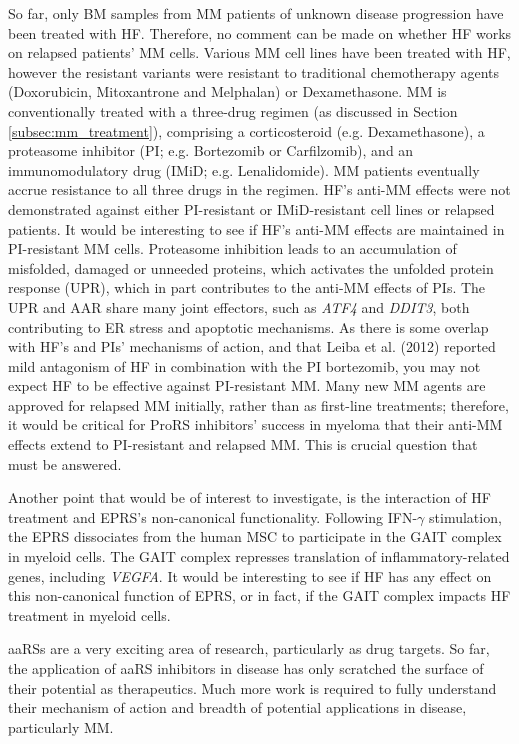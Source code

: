 So far, only BM samples from MM patients of unknown disease progression have been treated with HF\@.
Therefore, no comment can be made on whether HF works on relapsed patients' MM cells.
Various MM cell lines have been treated with HF, however the resistant variants were resistant to traditional chemotherapy agents (Doxorubicin, Mitoxantrone and Melphalan) or Dexamethasone.
MM is conventionally treated with a three-drug regimen (as discussed in Section \ref{subsec:mm_treatment}), comprising a corticosteroid (e.g. Dexamethasone), a proteasome inhibitor (PI; e.g. Bortezomib or Carfilzomib), and an immunomodulatory drug (IMiD; e.g. Lenalidomide).
MM patients eventually accrue resistance to all three drugs in the regimen.
HF's anti-MM effects were not demonstrated against either PI-resistant or IMiD-resistant cell lines or relapsed patients.
It would be interesting to see if HF's anti-MM effects are maintained in PI-resistant MM cells.
Proteasome inhibition leads to an accumulation of misfolded, damaged or unneeded proteins, which activates the unfolded protein response (UPR), which in part contributes to the anti-MM effects of PIs.
The UPR and AAR share many joint effectors, such as \textit{ATF4} and \textit{DDIT3}, both contributing to ER stress and apoptotic mechanisms.
As there is some overlap with HF's and PIs' mechanisms of action, and that Leiba et al. (2012) reported mild antagonism of HF in combination with the PI bortezomib\cite{leiba2012halofuginone}, you may not expect HF to be effective against PI-resistant MM.
Many new MM agents are approved for relapsed MM initially, rather than as first-line treatments;
therefore, it would be critical for ProRS inhibitors' success in myeloma that their anti-MM effects extend to PI-resistant and relapsed MM.
This is crucial question that must be answered.

Another point that would be of interest to investigate, is the interaction of HF treatment and EPRS's non-canonical functionality.
Following IFN-$\gamma$ stimulation, the EPRS dissociates from the human MSC to participate in the GAIT complex in myeloid cells.
The GAIT complex represses translation of inflammatory-related genes, including \textit{VEGFA}.
It would be interesting to see if HF has any effect on this non-canonical function of EPRS, or in fact, if the GAIT complex impacts HF treatment in myeloid cells.

aaRSs are a very exciting area of research, particularly as drug targets.
So far, the application of aaRS inhibitors in disease has only scratched the surface of their potential as therapeutics.
Much more work is required to fully understand their mechanism of action and breadth of potential applications in disease, particularly MM\@.
